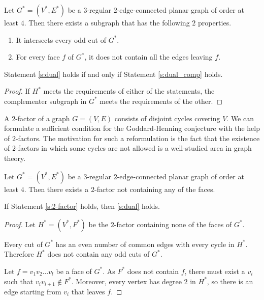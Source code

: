 \begin{guess}\label{s:dual_comp}
  Let $G^* = (V^*, E^*)$ be a $3$-regular $2$-edge-connected planar graph of order at least $4$.
  Then there exists a subgraph that has the following $2$ properties.
  \begin{enumerate}
    \item It intersects every odd cut of $G^*$.
    \item For every face $f$ of $G^*$, it does not contain all the edges leaving $f$.
  \end{enumerate}
\end{guess}

\begin{claim}
  Statement \ref{s:dual} holds if and only if Statement \ref{s:dual_comp} holds.
\end{claim}
\begin{proof}
  If $H^*$ meets the requirements of either of the statements, the complementer subgraph in $G^*$
  meets the requirements of the other.
\end{proof}

A $2$-factor of a graph $G = (V, E)$ consists of disjoint cycles covering $V$.
We can formulate a sufficient condition for the Goddard-Henning conjecture with
the help of $2$-factors. The motivation for such a reformulation is the fact that
the existence of $2$-factors in which some cycles are not allowed is a well-studied
area in graph theory.

\begin{guess} \label{s:2-factor}
  Let $G^* = (V^*, E^*)$ be a $3$-regular $2$-edge-connected planar graph of order at least $4$.
  Then there exists a $2$-factor not containing any of the faces.
\end{guess}
\begin{claim} \label{c:2-factor}
  If Statement \ref{s:2-factor} holds, then \ref{s:dual} holds.
\end{claim}
\begin{proof}
  Let $H^* = (V^*, F^*)$ be the $2$-factor containing none of the faces of $G^*$.

  Every cut of $G^*$ has an even number of common edges with every cycle in $H^*$.
  Therefore $H^*$ does not contain any odd cuts of $G^*$.

  Let $f = v_1v_2 \dots v_l$ be a face of $G^*$. As $F^*$ does not contain $f$,
  there must exist a $v_i$ such that $v_iv_{i + 1} \notin F^*$. Moreover, every
  vertex has degree $2$ in $H^*$, so there is an edge starting from $v_i$ that leaves $f$.
\end{proof}

